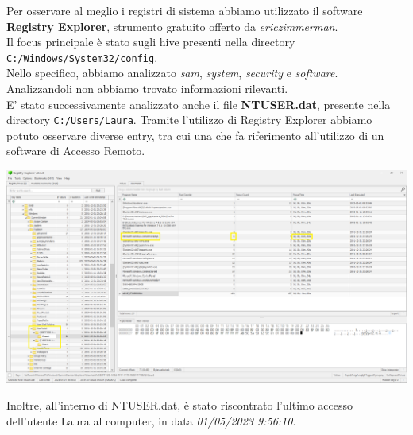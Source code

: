 Per osservare al meglio i registri di sistema abbiamo utilizzato il software \textbf{Registry Explorer}, strumento gratuito offerto da \textit{ericzimmerman}.\\
Il focus principale è stato sugli hive presenti nella directory \texttt{C:/Windows/System32/config}.\\
Nello specifico, abbiamo analizzato \textit{sam}, \textit{system}, \textit{security} e \textit{software}. Analizzandoli non abbiamo trovato informazioni rilevanti.\vspace{14pt}\\
E' stato successivamente analizzato anche il file \textbf{NTUSER.dat}, presente nella directory \texttt{C:/Users/Laura}. Tramite l'utilizzo di Registry Explorer abbiamo potuto osservare diverse entry, tra cui una che fa riferimento all'utilizzo di un software di Accesso Remoto.
\begin{center}
    \includegraphics[width=1\textwidth]{img/ntuser-remote.png}
\end{center}
Inoltre, all'interno di NTUSER.dat, è stato riscontrato l'ultimo accesso dell'utente Laura al computer, in data \textit{01/05/2023 9:56:10}.
